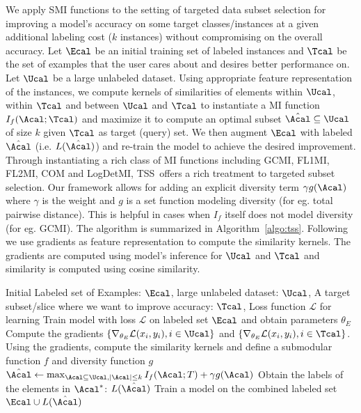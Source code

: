\documentclass{article}
\newcommand{\modelss}{\mbox{\textsc{TSS}}}
\begin{document}
We apply SMI functions to the setting of targeted data subset selection for improving a model's accuracy on some target classes/instances at a given additional labeling cost ($k$ instances) without compromising on the overall accuracy. Let $\Ecal$ be an initial training set of labeled instances and $\Tcal$ be the set of examples that the user cares about and desires better performance on. Let $\Ucal$ be a large unlabeled dataset. Using appropriate feature representation of the instances, we compute kernels of similarities of elements within $\Ucal$, within $\Tcal$ and between $\Ucal$ and $\Tcal$ to instantiate a MI function $I_f(\Acal; \Tcal)$ and maximize it to compute an optimal subset $\hat{\Acal} \subseteq \Ucal$ of size $k$ given $\Tcal$ as target (query) set. We then augment $\Ecal$ with labeled $\hat{\Acal}$ (i.e. $L(\hat{\Acal})$) and re-train the model to achieve the desired improvement. Through instantiating a rich class of MI functions including GCMI, FL1MI, FL2MI, COM and LogDetMI, \modelss\ offers a rich treatment to targeted subset selection. Our framework allows for adding an explicit diversity term $\gamma g(\Acal)$ where $\gamma$ is the weight and $g$ is a set function modeling diversity (for eg. total pairwise distance). This is helpful in cases when $I_f$ itself does not model diversity (for eg. GCMI). The algorithm is summarized in Algorithm~\ref{algo:tss}. Following ~\cite{ash2020deep, killamsetty2020glister} we use gradients as feature representation to compute the similarity kernels. The gradients are computed using model's inference for $\Ucal$ and $\Tcal$ and similarity is computed using cosine similarity. 

\begin{algorithm}%
\begin{algorithmic}[1]
\REQUIRE Initial Labeled set of Examples: $\Ecal$, large unlabeled dataset: $\Ucal$, A target subset/slice where we want to improve accuracy: $\Tcal$, Loss function $\mathcal L$ for learning
\STATE Train model with loss $\mathcal L$ on labeled set $\Ecal$ and obtain parameters $\theta_E$
\STATE Compute the gradients $\{\nabla_{\theta_E} \mathcal L(x_i, y_i), i \in \Ucal\}$ and $\{\nabla_{\theta_E} \mathcal L(x_i, y_i), i \in \Tcal\}$.
\STATE Using the gradients, compute the similarity kernels  and define a submodular function $f$ and diversity function $g$
\STATE $\hat{\Acal} \gets \max_{\Acal \subseteq \Ucal, |\Acal|\leq k} I_f(\Acal;T) + \gamma g(\Acal)$
\STATE Obtain the labels of the elements in $\Acal^*$: $L(\hat{\Acal})$
\STATE Train a model on the combined labeled set $\Ecal \cup L(\hat{\Acal})$
\end{algorithmic}
\caption{\modelss}
\label{algo:tss}
\end{algorithm}
\end{document}
